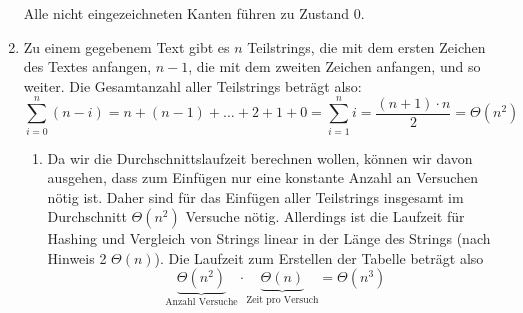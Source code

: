 \documentclass[11pt,a4paper]{article}
\begin{document}
\begin{loesung}
\begin{enumerate}
\begin{figure}[h!]
        \end{figure}
        \FloatBarrier
        Alle nicht eingezeichneten Kanten führen zu Zustand 0.

        \item
        Zu einem gegebenem Text gibt es $n$ Teilstrings, die mit dem ersten Zeichen des Textes anfangen, $n - 1$, die mit dem zweiten Zeichen anfangen, und so weiter.
        Die Gesamtanzahl aller Teilstrings beträgt also:
        \begin{equation*}
            \sum\limits_{i = 0}^n (n - i) = n + (n - 1) + \ldots + 2 + 1 + 0 = \sum\limits_{i = 1}^n i = \frac{(n + 1) \cdot n}{2} = \Theta(n^2)
        \end{equation*}

        \begin{enumerate}[label=\roman*)]
            \item Da wir die Durchschnittslaufzeit berechnen wollen, können wir davon ausgehen, dass zum Einfügen nur eine konstante Anzahl an Versuchen nötig ist.
            Daher sind für das Einfügen aller Teilstrings insgesamt im Durchschnitt $\Theta(n^2)$ Versuche nötig.
            Allerdings ist die Laufzeit für Hashing und Vergleich von Strings linear in der Länge des Strings (nach Hinweis 2 $\Theta(n)$).
            Die Laufzeit zum Erstellen der Tabelle beträgt also 
            \begin{equation*}
                \underbrace{\Theta(n^2)}_{\text{Anzahl Versuche}} \cdot \underbrace{\Theta(n)}_{\text{Zeit pro Versuch}} = \Theta(n^3)
            \end{equation*}


\end{enumerate}
\end{enumerate}
\end{loesung}
\end{document}
